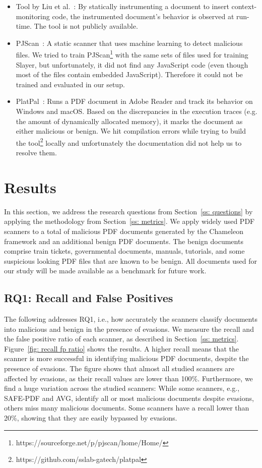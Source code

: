 \begin{itemize}
    \item Tool by Liu et al.~\cite{liu2014detecting}: By statically instrumenting a document to insert context-monitoring code, the instrumented document's behavior is observed at run-time. The tool is not publicly available.
    \item PJScan~\cite{laskov2011static}: A static scanner that uses machine learning to detect malicious files. We tried to train PJScan\footnote{https://sourceforge.net/p/pjscan/home/Home/} with the same sets of files used for training Slayer, but unfortunately, it did not find any JavaScript code (even though most of the files contain embedded JavaScript). Therefore it could not be trained and evaluated in our setup.
    \item PlatPal~\cite{xu2017platpal}: Runs a PDF document in Adobe Reader and track its behavior on Windows and macOS. Based on the discrepancies in the execution traces (e.g. the amount of dynamically allocated memory), it marks the document as either malicious or benign. We hit compilation errors while trying to build the tool\footnote{https://github.com/sslab-gatech/platpal} locally and unfortunately the documentation did not help us to resolve them.
\end{itemize}


\section{Results}
\label{ss: results}

In this section, we address the research questions from Section~\ref{ss: questions} 
by applying the methodology from Section~\ref{ss: metrics}.
We apply \nbAnalyzers{} widely used PDF scanners to a total of \nbSamplesSize{} malicious PDF documents generated by the Chameleon framework and an additional \nbBenignsSize{} benign PDF documents.
The benign documents comprise train tickets, governmental documents, manuals, tutorials, and some suspicious looking PDF files that are known to be benign.
All documents used for our study will be made available as a benchmark for future work.

\subsection{RQ1: Recall and False Positives}
\label{ss: recall fps}

The following addresses RQ1, i.e., how accurately the scanners classify 
documents into malicious and benign in the presence of evasions.
We measure the recall and the false positive 
ratio of each scanner, as described in Section~\ref{ss: metrics}.
Figure~\ref{fig: recall fp ratio} shows the results.
A higher recall means that the scanner is more successful in 
identifying malicious PDF documents, despite the presence of evasions.
The figure shows that almost all studied scanners are affected by evasions, 
as their recall values are lower than 100\%.
Furthermore, we find a huge variation across the studied scanners: While 
some scanners, e.g., SAFE-PDF and AVG, identify all or most malicious documents despite 
evasions, others miss many malicious documents.
Some scanners have a recall lower than 20\%, showing that they are easily 
bypassed by evasions.

